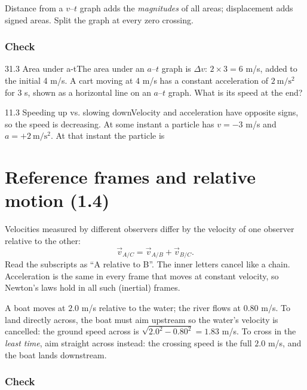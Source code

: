 \documentclass[11pt]{article}
\begin{document}
\begin{trap}
Distance from a $v$--$t$ graph adds the \emph{magnitudes} of all areas; displacement adds signed areas. Split the graph at every zero crossing.
\end{trap}

\subsubsection{Check}\mbox{}

\begin{q}{3}{1.3 Area under a-t}{The area under an $a$--$t$ graph is $\Delta v$: $2 \times 3 = 6$ m/s, added to the initial 4 m/s.}
A cart moving at $4$ m/s has a constant acceleration of $2\ \mathrm{m/s^2}$ for $3$ s, shown as a horizontal line on an $a$--$t$ graph. What is its speed at the end?
\end{q}
\begin{q}{1}{1.3 Speeding up vs. slowing down}{Velocity and acceleration have opposite signs, so the speed is decreasing.}
At some instant a particle has $v = -3$ m/s and $a = +2\ \mathrm{m/s^2}$. At that instant the particle is
\end{q}

\section{Reference frames and relative motion (1.4)}\label{sec:4}

Velocities measured by different observers differ by the velocity of one observer relative to the other:
\[ \vec v_{A/C} = \vec v_{A/B} + \vec v_{B/C}. \]
Read the subscripts as ``A relative to B''. The inner letters cancel like a chain. Acceleration is the same in every frame that moves at constant velocity, so Newton's laws hold in all such (inertial) frames.

\begin{example}
A boat moves at $2.0$ m/s relative to the water; the river flows at $0.80$ m/s. To land directly across, the boat must aim upstream so the water's velocity is cancelled: the ground speed across is $\sqrt{2.0^2 - 0.80^2} = 1.83$ m/s. To cross in the \emph{least time}, aim straight across instead: the crossing speed is the full $2.0$ m/s, and the boat lands downstream.
\end{example}

\subsubsection{Check}\mbox{}
\end{document}
